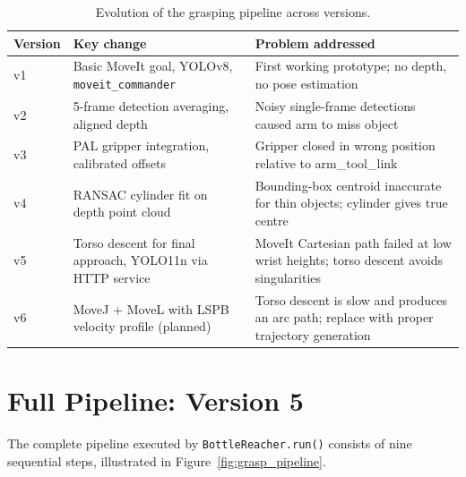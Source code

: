 \begin{table}[H]
\centering
\caption{Evolution of the grasping pipeline across versions.}
\label{tab:grasp_versions}
\begin{tabularx}{\linewidth}{lXX}
\toprule
\textbf{Version} & \textbf{Key change} & \textbf{Problem addressed} \\
\midrule
v1 & Basic MoveIt goal, YOLOv8, \texttt{moveit\_commander} &
     First working prototype; no depth, no pose estimation \\
v2 & 5-frame detection averaging, aligned depth &
     Noisy single-frame detections caused arm to miss object \\
v3 & PAL gripper integration, calibrated offsets &
     Gripper closed in wrong position relative to arm\_tool\_link \\
v4 & RANSAC cylinder fit on depth point cloud &
     Bounding-box centroid inaccurate for thin objects; cylinder gives true centre \\
v5 & Torso descent for final approach, YOLO11n via HTTP service &
     MoveIt Cartesian path failed at low wrist heights; torso descent avoids singularities \\
v6 & MoveJ + MoveL with LSPB velocity profile (planned) &
     Torso descent is slow and produces an arc path; replace with proper trajectory generation \\
\bottomrule
\end{tabularx}
\end{table}

\section{Full Pipeline: Version 5}

The complete pipeline executed by \texttt{BottleReacher.run()} consists of nine
sequential steps, illustrated in Figure~\ref{fig:grasp_pipeline}.

